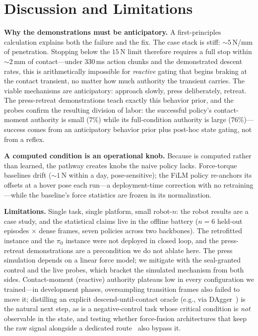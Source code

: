 \section{Discussion and Limitations}
\label{sec:discussion}

\textbf{Why the demonstrations must be anticipatory.}
A first-principles calculation explains both the failure and the fix. The case stack is stiff:
${\sim}5$\,N/mm of penetration. Stopping below the $15$\,N limit therefore requires a full stop
within ${\sim}2$\,mm of contact---under $330$\,ms action chunks and the demonstrated descent
rates, this is arithmetically impossible for \emph{reactive} gating that begins braking at the
contact transient, no matter how much authority the transient carries. The viable mechanisms are
anticipatory: approach slowly, press deliberately, retreat. The press-retreat demonstrations
teach exactly this behavior prior, and the probes confirm the resulting division of labor: the
successful policy's contact-moment authority is small ($7\%$) while its full-condition authority
is large ($76\%$)---success comes from an anticipatory behavior prior plus post-hoc state
gating, not from a reflex.

\textbf{A computed condition is an operational knob.}
Because \chat{} is computed rather than learned, the pathway creates knobs the naive policy lacks. Force-torque baselines drift
(${\sim}1$\,N within a day, pose-sensitive); the FiLM policy re-anchors its offsets at a
hover pose each run---a deployment-time correction with no retraining---while the baseline's
force statistics are frozen in its normalization.

\textbf{Limitations.}
Single task, single platform, small robot-$n$: the robot results are a case study, and the
statistical claims live in the offline battery ($n{=}6$ held-out episodes $\times$ dense frames,
seven policies across two backbones). The retrofitted instance and the $\pi_0$ instance were
not deployed in closed loop, and the press-retreat demonstrations are a precondition we do not
ablate here. The press simulation depends on a linear force model;
we mitigate with the seal-granted control and the live probes, which bracket the simulated
mechanism from both sides. Contact-moment (reactive) authority plateaus low in every
configuration we trained---in development phases, oversampling transition frames also failed to
move it; distilling an explicit
descend-until-contact oracle (e.g., via DAgger~\cite{ross2011dagger,chen2020lbc}) is the natural
next step, as is a negative-control task whose critical condition is \emph{not} observable in
the state, and testing whether force-fusion architectures that keep the raw signal alongside a
dedicated route~\cite{forcevla,forceflow} also bypass it.
